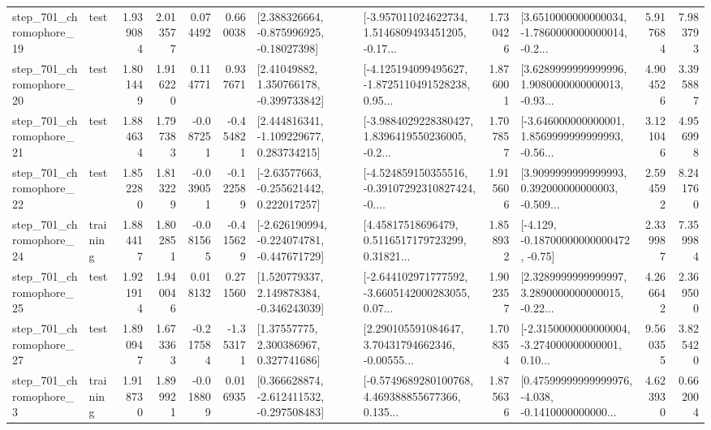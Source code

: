 \begin{tabular}{llrrrrllrlrr}
  step\_701\_chromophore\_19 &      test &      1.939084 &    2.013577 &      0.074492 &  0.660038 &    [2.388326664, -0.875996925, -0.18027398] &  [-3.957011024622734, 1.5146809493451205, -0.17... &       1.730426 &  [3.6510000000000034, -1.7860000000000014, -0.2... &            5.917684 &          7.983793 \\
  step\_701\_chromophore\_20 &      test &      1.801449 &    1.916220 &      0.114771 &  0.937671 &     [2.41049882, 1.350766178, -0.399733842] &  [-4.125194099495627, -1.8725110491528238, 0.95... &       1.876001 &  [3.6289999999999996, 1.9080000000000013, -0.93... &            4.904526 &          3.395887 \\
  step\_701\_chromophore\_21 &      test &      1.884634 &    1.797383 &     -0.087251 & -0.454821 &    [2.444816341, -1.109229677, 0.283734215] &  [-3.9884029228380427, 1.8396419550236005, -0.2... &       1.707857 &  [-3.646000000000001, 1.8569999999999993, -0.56... &            3.121046 &          4.956998 \\
  step\_701\_chromophore\_22 &      test &      1.852280 &    1.813229 &     -0.039051 & -0.122589 &    [-2.63577663, -0.255621442, 0.222017257] &  [-4.524859150355516, -0.39107292310827424, -0.... &       1.915606 &  [3.9099999999999993, 0.392000000000003, -0.509... &            2.594592 &          8.241760 \\
  step\_701\_chromophore\_24 &  training &      1.884417 &    1.802851 &     -0.081565 & -0.415629 &  [-2.626190994, -0.224074781, -0.447671729] &  [4.45817518696479, 0.5116517179723299, 0.31821... &       1.858932 &              [-4.129, -0.18700000000000472, -0.75] &            2.339987 &          7.359984 \\
  step\_701\_chromophore\_25 &      test &      1.921914 &    1.940046 &      0.018132 &  0.271560 &    [1.520779337, 2.149878384, -0.346243039] &  [-2.644102971777592, -3.6605142000283055, 0.07... &       1.902357 &  [2.3289999999999997, 3.2890000000000015, -0.22... &            4.266642 &          2.369500 \\
  step\_701\_chromophore\_27 &      test &      1.890947 &    1.673363 &     -0.217584 & -1.353171 &      [1.37557775, 2.300386967, 0.327741686] &  [2.290105591084647, 3.70431794662346, -0.00555... &       1.708354 &  [-2.3150000000000004, -3.274000000000001, 0.10... &            9.560355 &          3.825420 \\
   step\_701\_chromophore\_3 &  training &      1.918730 &    1.899921 &     -0.018809 &  0.016935 &   [0.366628874, -2.612411532, -0.297508483] &  [-0.5749689280100768, 4.469388855677366, 0.135... &       1.875636 &  [0.47599999999999976, -4.038, -0.1410000000000... &            4.623930 &          0.662004 \\

\end{tabular}
